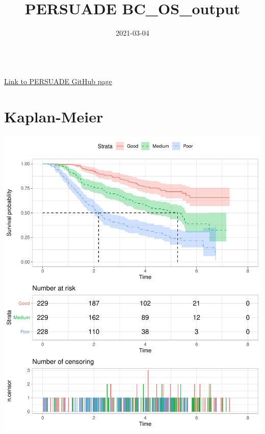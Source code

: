 \documentclass[
]{article}
\title{PERSUADE BC\_OS\_output}
\author{}
\date{\vspace{-2.5em}2021-03-04}
\begin{document}
\maketitle

{
\hypersetup{linkcolor=}
\setcounter{tocdepth}{2}
\tableofcontents
}
~\\

\href{https://github.com/Bram-R/PERSUADE}{Link to PERSUADE GitHub page}
\newpage

\hypertarget{kaplan-meier}{%
\section{Kaplan-Meier}\label{kaplan-meier}}

\begin{flushleft}\includegraphics{Images/plot_KM-1} \end{flushleft}
\end{document}

